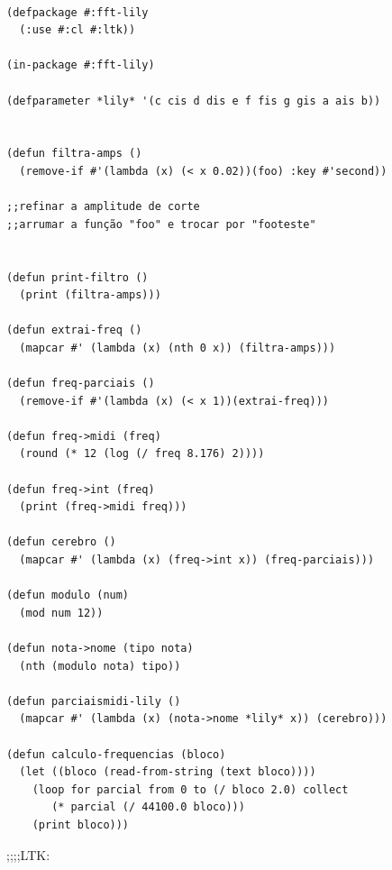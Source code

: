 \documentclass[draft]{ppgmus}
\begin{document}
\begin{verbatim}
 
(defpackage #:fft-lily
  (:use #:cl #:ltk))

(in-package #:fft-lily)

(defparameter *lily* '(c cis d dis e f fis g gis a ais b))


(defun filtra-amps ()
  (remove-if #'(lambda (x) (< x 0.02))(foo) :key #'second))

;;refinar a amplitude de corte
;;arrumar a função "foo" e trocar por "footeste"


(defun print-filtro ()
  (print (filtra-amps)))

(defun extrai-freq ()
  (mapcar #' (lambda (x) (nth 0 x)) (filtra-amps))) 

(defun freq-parciais ()
  (remove-if #'(lambda (x) (< x 1))(extrai-freq)))

(defun freq->midi (freq)
  (round (* 12 (log (/ freq 8.176) 2))))

(defun freq->int (freq)
  (print (freq->midi freq)))

(defun cerebro ()
  (mapcar #' (lambda (x) (freq->int x)) (freq-parciais))) 

(defun modulo (num)
  (mod num 12))

(defun nota->nome (tipo nota)
  (nth (modulo nota) tipo))

(defun parciaismidi-lily ()
  (mapcar #' (lambda (x) (nota->nome *lily* x)) (cerebro)))

(defun calculo-frequencias (bloco)
  (let ((bloco (read-from-string (text bloco))))
    (loop for parcial from 0 to (/ bloco 2.0) collect
       (* parcial (/ 44100.0 bloco)))
    (print bloco)))

\end{verbatim}



;;;;LTK:
\end{document}
